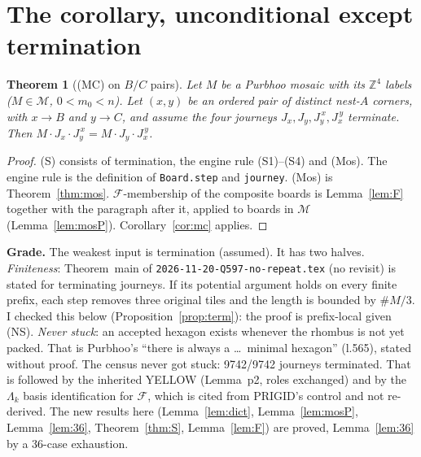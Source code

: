 \documentclass[11pt]{article}
\newtheorem{theorem}{Theorem}\newtheorem{lemma}[theorem]{Lemma}\newtheorem{proposition}[theorem]{Proposition}
\theoremstyle{definition}\newtheorem{definition}[theorem]{Definition}\newtheorem{remark}[theorem]{Remark}
\newcommand{\Z}{\mathbb Z}\newcommand{\R}{\mathbb R}
\newcommand{\M}{\mathcal M}\newcommand{\F}{\mathcal F}
\begin{document}
\section{The corollary, unconditional except termination}\label{sec:final}
\begin{theorem}[(MC) on $B/C$ pairs]\label{thm:final}
Let $M$ be a Purbhoo mosaic with its $\Z^4$ labels ($M\in\M$, $0<m_0<n$). Let $(x,y)$ be an ordered pair of distinct nest-$A$ corners, with $x\to B$ and $y\to C$, and assume the four journeys $J_x,J_y,J_y^{\,x},J_x^{\,y}$ terminate. Then $M\cdot J_x\cdot J_y^{\,x}=M\cdot J_y\cdot J_x^{\,y}$.
\end{theorem}
\begin{proof}
(S) consists of termination, the engine rule (S1)--(S4) and (Mos). The engine rule is the definition of \texttt{Board.step} and \texttt{journey}. (Mos) is Theorem~\ref{thm:mos}. $\F$-membership of the composite boards is Lemma~\ref{lem:F} together with the paragraph after it, applied to boards in $\M$ (Lemma~\ref{lem:mosP}). Corollary~\ref{cor:mc} applies.
\end{proof}
\textbf{Grade.} The weakest input is termination (assumed). It has two halves. \emph{Finiteness}: Theorem~main of \texttt{2026-11-20-Q597-no-repeat.tex} (no revisit) is stated for terminating journeys. If its potential argument holds on every finite prefix, each step removes three original tiles and the length is bounded by $\#M/3$. I checked this below (Proposition~\ref{prop:term}): the proof is prefix-local given (NS). \emph{Never stuck}: an accepted hexagon exists whenever the rhombus is not yet packed. That is Purbhoo's ``there is always a \ldots\ minimal hexagon'' (l.565), stated without proof. The census never got stuck: 9742/9742 journeys terminated. That is followed by the inherited YELLOW (Lemma~p2, roles exchanged) and by the $\Lambda_k$ basis identification for $\F$, which is cited from PRIGID's control and not re-derived. The new results here (Lemma~\ref{lem:dict}, Lemma~\ref{lem:mosP}, Lemma~\ref{lem:36}, Theorem~\ref{thm:S}, Lemma~\ref{lem:F}) are proved, Lemma~\ref{lem:36} by a 36-case exhaustion.
\end{document}
